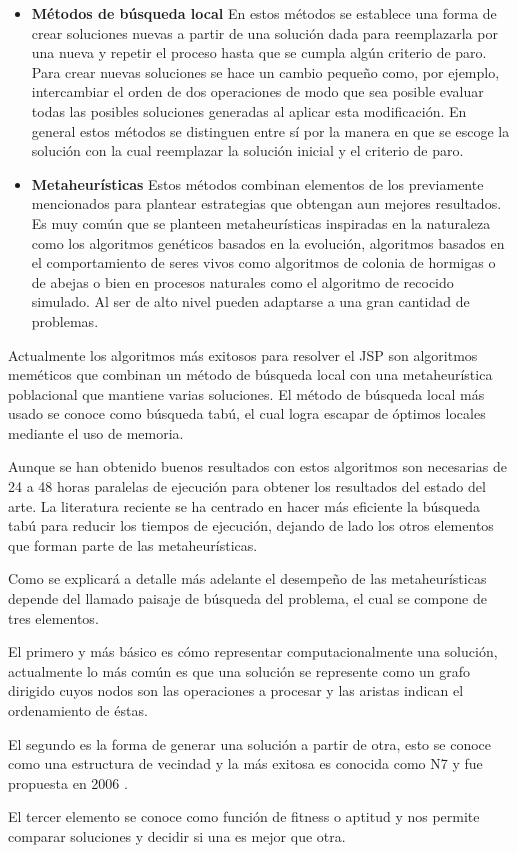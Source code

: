 \begin{itemize}
\item \textbf{Métodos de búsqueda local} En estos métodos se establece una forma de crear soluciones nuevas a partir de una solución dada para reemplazarla por una nueva y repetir el proceso hasta que se cumpla algún criterio de paro. 
    Para crear nuevas soluciones se hace un cambio pequeño como, por ejemplo, intercambiar el orden de dos operaciones de modo que sea posible evaluar todas las posibles soluciones generadas al aplicar esta modificación. 
        En general estos métodos se distinguen entre sí por la manera en que se escoge la solución con la cual reemplazar la solución inicial y el criterio de paro.
\item \textbf{Metaheurísticas} Estos métodos combinan elementos de los previamente mencionados para plantear estrategias que obtengan aun mejores resultados. 
    Es muy común que se planteen metaheurísticas inspiradas en la naturaleza como los algoritmos genéticos basados en la evolución, algoritmos basados en el comportamiento de seres vivos como algoritmos de colonia de hormigas o de abejas o bien en procesos naturales como el algoritmo de recocido simulado. Al ser de alto nivel pueden adaptarse a una gran cantidad de problemas.
\end{itemize}

Actualmente los algoritmos más exitosos para resolver el JSP son algoritmos meméticos que combinan un método de búsqueda local con una metaheurística poblacional que mantiene varias soluciones. El método de búsqueda local más usado se conoce como búsqueda tabú, el cual logra escapar de óptimos locales mediante el uso de memoria.

Aunque se han obtenido buenos resultados con estos algoritmos son necesarias de 24 a 48 horas paralelas de ejecución para obtener los resultados del estado del arte. La literatura reciente se ha centrado en hacer más eficiente la búsqueda tabú para reducir los tiempos de ejecución, dejando de lado los otros elementos que forman parte de las metaheurísticas. 

Como se explicará a detalle más adelante el desempeño de las metaheurísticas depende del llamado paisaje de búsqueda del problema, el cual se compone de tres elementos.

El primero y más básico es cómo representar computacionalmente una solución, actualmente lo más común es que una solución se represente como un grafo dirigido cuyos nodos son las operaciones a procesar y las aristas indican el ordenamiento de éstas.

El segundo es la forma de generar una solución a partir de otra, esto se conoce como una estructura de vecindad y la más exitosa es conocida como N7 y fue propuesta en 2006 \cite{Zhang2007}. 

El tercer elemento se conoce como función de fitness o aptitud y nos permite comparar soluciones y decidir si una es mejor que otra. 


